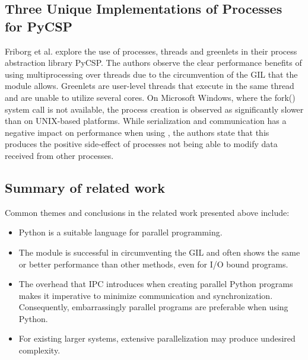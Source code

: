 \subsection{Three Unique Implementations of Processes for PyCSP}
Friborg et al. \cite{friborg_2009_three_tuiopfp} explore the use of processes, threads and greenlets in their process abstraction
library PyCSP. The authors observe the clear performance benefits of using multiprocessing over threads due to the circumvention of the GIL
that the  module allows. Greenlets are user-level threads that execute in the same thread and are unable to utilize
several cores. On Microsoft Windows, where the fork() system call is not available, the process creation is observed as
significantly slower than on UNIX-based platforms. While serialization and communication has a negative impact on performance when
using , the authors state that this produces the positive side-effect of processes not being able to
modify data received from other processes.

\subsection{Summary of related work}
Common themes and conclusions in the related work presented above include:

\begin{itemize}
  \item Python is a suitable language for parallel programming.
  \item The  module is successful in circumventing the GIL and often shows the same or better performance than other
    methods, even for I/O bound programs.
  \item The overhead that IPC introduces when creating parallel Python programs makes it imperative to minimize communication and
    synchronization. Consequently, embarrassingly parallel programs are preferable when using Python.
  \item For existing larger systems, extensive parallelization may produce undesired complexity.
\end{itemize}
